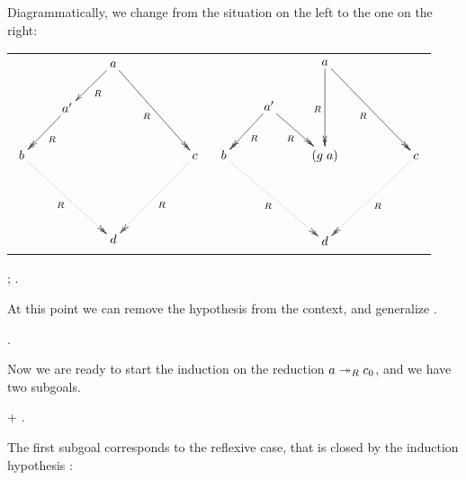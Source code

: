         Diagrammatically, we change from the situation on the left to
        the one on the right:


        \begin{tabular}{c@{\hskip 0.5cm}c} $\xymatrix{ & & a
        \ar@{->>}[ddrr]_R \ar@{->}[dl]^R & & \\ & a' \ar@{->>}[dl]^R &
        & & \\ b \ar@{.>>}[ddrr]_R & & & & c \ar@{.>>}[ddll]^R \\ & &
        & & \\ & & d & & }$ & $\xymatrix{ & & a \ar@{->>}[ddrr]_R
        \ar@{->>}[dd]_R & & \\ & a' \ar@{->>}[dl]^R \ar@{->>}[dr]_R &
        & & \\ b \ar@{.>>}[ddrr]_R & & (g \; a) & & c
        \ar@{.>>}[ddll]^R \\ & & & & \\ & & d & & }$ \end{tabular} \begin{coqdoccode}
\coqdocnoindent
\coqdoceol
\coqdocindent{2.00em}
 ;   . \end{coqdoccode}
At this point we can remove
      the hypothesis  from the context, and generalize . \begin{coqdoccode}
\coqdocemptyline
\coqdocindent{2.00em}
 . \end{coqdoccode}
Now we are ready to start the induction on
    the reduction $a\twoheadrightarrow_R c_0$, and we have two subgoals. \begin{coqdoccode}
\coqdocemptyline
\coqdocindent{2.00em}
+     . \end{coqdoccode}
The first subgoal corresponds
        to the reflexive case, that is closed by the induction
        hypothesis :


